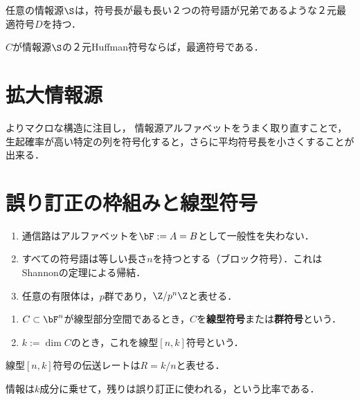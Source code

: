 \documentclass[uplatex,dvipdfmx]{jsreport}
\begin{document}
\begin{lemma}
    任意の情報源$\S$は，符号長が最も長い２つの符号語が兄弟であるような２元最適符号$D$を持つ．
\end{lemma}

\begin{theorem}
    $C$が情報源$\S$の２元Huffman符号ならば，最適符号である．
\end{theorem}

\section{拡大情報源}

\begin{tcolorbox}[colframe=ForestGreen, colback=ForestGreen!10!white,breakable,colbacktitle=ForestGreen!40!white,coltitle=black,fonttitle=\bfseries\sffamily,
title=]
    よりマクロな構造に注目し，
    情報源アルファベットをうまく取り直すことで，生起確率が高い特定の列を符号化すると，さらに平均符号長を小さくすることが出来る．
\end{tcolorbox}


\section{誤り訂正の枠組みと線型符号}

\begin{notation}\mbox{}
    \begin{enumerate}
        \item 通信路はアルファベットを$\bF:=A=B$として一般性を失わない．
        \item すべての符号語は等しい長さ$n$を持つとする（ブロック符号）．これはShannonの定理による帰結．
        \item 任意の有限体は，$p$群であり，$\Z/p^n\Z$と表せる．
    \end{enumerate}
\end{notation}

\begin{definition}\mbox{}
    \begin{enumerate}
        \item $C\subset\bF^n$が線型部分空間であるとき，$C$を\textbf{線型符号}または\textbf{群符号}という．
        \item $k:=\dim C$のとき，これを線型$[n,k]$符号という．
    \end{enumerate}
\end{definition}

\begin{lemma}
    線型$[n,k]$符号の伝送レートは$R=k/n$と表せる．
\end{lemma}
\begin{remarks}
    情報は$k$成分に乗せて，残りは誤り訂正に使われる，という比率である．
\end{remarks}
\end{document}
